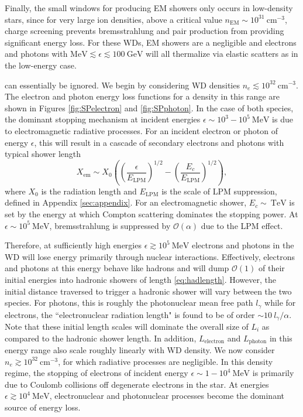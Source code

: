 \documentclass[twocolumn,showpacs,preprintnumbers,amsmath,amssymb,prd]{revtex4}
\newcommand{\OO}{\mathcal{O}}
\newcommand{\GeV}{\text{GeV}}
\newcommand{\MeV}{\text{MeV}}
\def\r{\right)}
\def\l{\left(}
\begin{document}
Finally, the small windows for producing EM showers only occurs in low-density stars, since for very large ion densities, above a critical value $n_\text{EM} \sim 10^{31} ~\text{cm}^{-3}$, charge screening prevents bremsstrahlung and pair production from providing significant energy loss. 
For these WDs, EM showers are a negligible and electrons and photons with $\MeV \lesssim \epsilon \lesssim 100~\GeV$ will all thermalize via elastic scatters as in the low-energy case. 


can essentially be ignored.
We begin by considering WD densities $n_e \lesssim 10^{32} ~\text{cm}^{-3}$.
The electron and photon energy loss functions for a density in this range are shown in Figures \ref{fig:SPelectron} and \ref{fig:SPphoton}.
In the case of both species, the dominant stopping mechanism at incident energies $\epsilon \sim 10^{3}-10^{5} ~\text{MeV}$ is due to electromagnetic radiative processes.
For an incident electron or photon of energy $\epsilon$, this will result in a cascade of secondary electrons and photons with typical shower length
\begin{equation}
X_\text{em} \sim X_0 \l \l \frac{\epsilon}{E_\text{LPM}}\r^{1/2} - \l \frac{E_c}{E_\text{LPM}}\r^{1/2} \r,
\end{equation}
where $X_0$ is the radiation length and $E_\text{LPM}$ is the scale of LPM suppression, defined in Appendix \ref{sec:appendix}.
For an electromagnetic shower, $E_c \sim ~\text{TeV}$ is set by the energy at which Compton scattering dominates the stopping power.
At $\epsilon \sim 10^{5} ~\text{MeV}$, bremsstrahlung is suppressed by $\OO(\alpha)$ due to the LPM effect.

Therefore, at sufficiently high energies $\epsilon \gtrsim 10^5 ~\text{MeV}$ electrons and photons in the WD will lose energy primarily through nuclear interactions.
Effectively, electrons and photons at this energy behave like hadrons and will dump $\OO(1)$ of their initial energies into hadronic showers of length \eqref{eq:hadlength}.
However, the initial distance traversed to trigger a hadronic shower will vary between the two species.
For photons, this is roughly the photonuclear mean free path $l_\gamma$ while for electrons, the ``electronuclear radiation length" is found to be of order $\sim 10  ~l_\gamma/\alpha$.
Note that these initial length scales will dominate the overall size of $L_i$ as compared to the hadronic shower length.
In addition, $L_\text{electron}$ and $L_\text{photon}$ in this energy range also scale roughly linearly with WD density.
We now consider $n_e \gtrsim 10^{32} ~\text{cm}^{-3}$, for which radiative processes are negligible.
In this density regime, the stopping of electrons of incident energy $\epsilon \sim 1 - 10^4 ~\text{MeV}$ is primarily due to Coulomb collisions off degenerate electrons in the star.
At energies $\epsilon \gtrsim 10^4 ~\text{MeV}$, electronuclear and photonuclear processes become the dominant source of energy loss.
\end{document}

